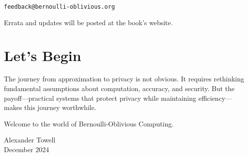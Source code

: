 \begin{center}
\texttt{feedback@bernoulli-oblivious.org}
\end{center}

Errata and updates will be posted at the book's website.

\section*{Let's Begin}

The journey from approximation to privacy is not obvious. It requires rethinking fundamental assumptions about computation, accuracy, and security. But the payoff—practical systems that protect privacy while maintaining efficiency—makes this journey worthwhile.

Welcome to the world of Bernoulli-Oblivious Computing.

\vspace{1cm}
\begin{flushright}
Alexander Towell\\
December 2024
\end{flushright}